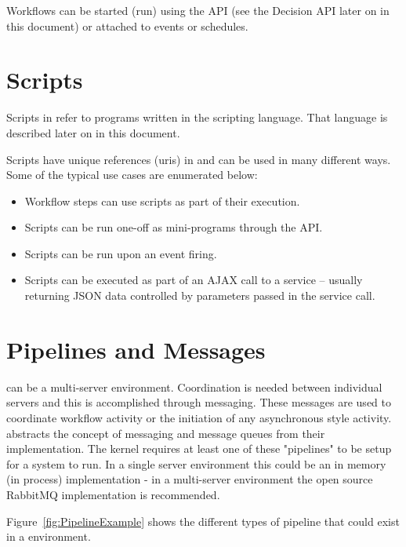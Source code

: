 Workflows can be started (run) using the \Rapture API (see the Decision API later on in this document) or attached to events or schedules.

\section{Scripts}

Scripts in \Rapture refer to programs written in the \Reflex scripting language. That language is described later on in this document.

Scripts have unique references (uris) in \Rapture and can be used in many different ways. Some of the typical use cases are enumerated below:

\begin{itemize}
	\item{Workflow steps can use scripts as part of their execution.}
	\item{Scripts can be run one-off as mini-programs through the \Rapture API.}
	\item{Scripts can be run upon an event firing.}
	\item{Scripts can be executed as part of an AJAX call to a service -- usually returning JSON data controlled by parameters passed in the service call.}
\end{itemize}

\section{Pipelines and Messages}
\Rapture can be a multi-server environment. Coordination is needed between individual servers and this is accomplished through messaging. These messages are
used to coordinate workflow activity or the initiation of any asynchronous style activity. \Rapture abstracts the concept of messaging and message queues from their
implementation. The \Rapture kernel requires at least one of these "pipelines" to be setup for a system to run. In a single server environment
this could be an in memory (in process) implementation - in a multi-server environment the open source RabbitMQ implementation is recommended.

Figure~\vref{fig:PipelineExample} shows the different types of pipeline that could exist in a \Rapture environment.

